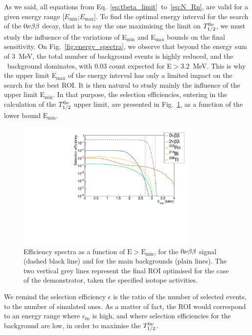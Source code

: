 
As we said, all equations from Eq.~\eqref{eq:tbeta_limit}~to~\eqref{eq:N_Rn}, are valid for a given energy range [$E_{\text{min}}$;$E_{\text{max}}$].
To find the optimal energy interval for the search of the $0\nu\beta\beta$ decay, that is to say the one maximising the limit on $T_{1/2}^{0\nu}$, we must study the influence of the variations of E$_{\text{min}}$ and E$_{\text{max}}$ bounds on the final sensitivity.
On Fig.~\ref{fig:energy_spectra}, we observe that beyond the energy sum of $3$~MeV, the total number of background events is highly reduced, and the \Tl\ background dominates, with $0.03$ count expected for E$>3.2$~MeV.
This is why the upper limit E$_{\text{max}}$ of the energy interval has only a limited impact on the search for the best ROI.
It is then natural to study mainly the influence of the upper limit E$_{\text{min}}$.
In that purpose, the selection efficiencies, entering in the calculation of the $T_{1/2}^{0\nu}$ upper limit, are presented in Fig.~\ref{fig:efficiency_spectra}, as a function of the lower bound $\text{E}_{\text{min}}$.
\begin{figure}[h!]
  \centering
  \includegraphics[width=0.8\textwidth]{Sensitivity/fig_sensitivity/efficiency_spectrum_with_B_82Se.pdf}
  \caption{Efficiency spectra as a function of $\text{E}>\text{E}_{\text{min}}$, for the $0\nu\beta\beta$ signal (dashed black line) and for the main backgrounds (plain lines).
    The two vertical grey lines represent the final ROI optimised for the case of the demonstrator, taken the specified isotope activities.
    \label{fig:efficiency_spectra}}
\end{figure}
We remind the selection efficiency $\epsilon$ is the ratio of the number of selected events, to the number of simulated ones.
As a matter of fact, the ROI would correspond to an energy range where $\epsilon_{0\nu}$ is high, and where selection efficiencies for the background are low, in order to maximise the $T_{1/2}^{0\nu}$.

